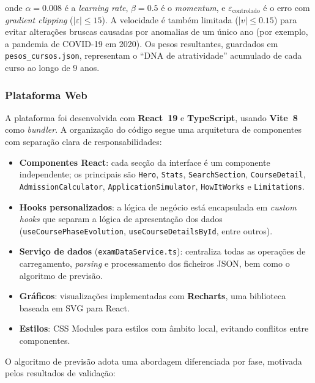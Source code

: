 \documentclass[12pt,a4paper]{article}
\begin{document}
onde $\alpha = 0.008$ é a \textit{learning rate}, $\beta = 0.5$ é o \textit{momentum}, e $\varepsilon_{\text{controlado}}$ é o erro com \textit{gradient clipping} ($|\varepsilon| \leq 15$). A velocidade é também limitada ($|v| \leq 0.15$) para evitar alterações bruscas causadas por anomalias de um único ano (por exemplo, a pandemia de COVID-19 em 2020). Os pesos resultantes, guardados em \texttt{pesos\_cursos.json}, representam o ``DNA de atratividade'' acumulado de cada curso ao longo de 9 anos.

\subsubsection{Plataforma Web}

A plataforma foi desenvolvida com \textbf{React~19} e \textbf{TypeScript}, usando \textbf{Vite~8} como \textit{bundler}. A organização do código segue uma arquitetura de componentes com separação clara de responsabilidades:

\begin{itemize}[noitemsep]
  \item \textbf{Componentes React}: cada secção da interface é um componente independente; os principais são \texttt{Hero}, \texttt{Stats}, \texttt{SearchSection}, \texttt{CourseDetail}, \texttt{AdmissionCalculator}, \texttt{ApplicationSimulator}, \texttt{HowItWorks} e \texttt{Limitations}.
  \item \textbf{Hooks personalizados}: a lógica de negócio está encapsulada em \textit{custom hooks} que separam a lógica de apresentação dos dados (\texttt{useCoursePhaseEvolution}, \texttt{useCourseDetailsById}, entre outros).
  \item \textbf{Serviço de dados} (\texttt{examDataService.ts}): centraliza todas as operações de carregamento, \textit{parsing} e processamento dos ficheiros JSON, bem como o algoritmo de previsão.
  \item \textbf{Gráficos}: visualizações implementadas com \textbf{Recharts}, uma biblioteca baseada em SVG para React.
  \item \textbf{Estilos}: CSS Modules para estilos com âmbito local, evitando conflitos entre componentes.
\end{itemize}

O algoritmo de previsão adota uma abordagem diferenciada por fase, motivada pelos resultados de validação:
\end{document}
